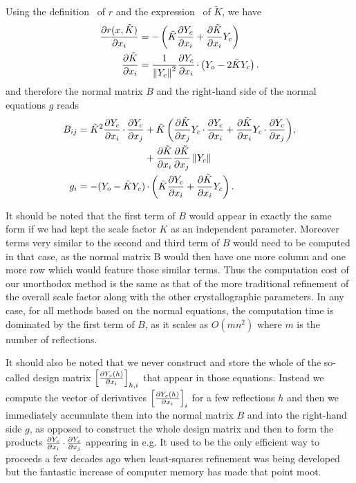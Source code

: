 \documentclass[pdf]{iucr}
\begin{document}
Using the definition~ of $r$ and the expression~ of $\tilde{K}$, we have
\begin{align}
\frac{\partial r(x, \tilde{K})}{\partial x_i} &= -\left( \tilde{K}\frac{\partial Y_c}{\partial x_i} + \frac{\partial \tilde{K}}{\partial x_i} Y_c \right) \\
\frac{\partial \tilde{K}}{\partial x_i} &= \frac{1}{\left\| Y_c \right\|^2}\frac{\partial Y_c}{\partial x_i} \operatorname{\cdot} \left(Y_o - 2 \tilde{K}Y_c \right).
\end{align}
and therefore the normal matrix $B$ and the right-hand side of the normal equations $g$ reads
\begin{align}
B_{ij} &= \begin{aligned}[t] \tilde{K}^2\frac{\partial Y_c}{\partial x_i} \operatorname{\cdot} \frac{\partial Y_c}{\partial x_j} 
&+ \tilde{K} \left( \frac{\partial \tilde{K}}{\partial x_j}Y_c \operatorname{\cdot} \frac{\partial Y_c}{\partial x_i}
+ \frac{\partial \tilde{K}}{\partial x_i}Y_c \operatorname{\cdot} \frac{\partial Y_c}{\partial x_j} \right) \nonumber\\
&+ \frac{\partial \tilde{K}}{\partial x_i}\frac{\partial \tilde{K}}{\partial x_j} \left\| Y_c \right\|
\end{aligned},
\label{eqn:normalmatrixwithoutscalefactor} \\
g_i &= - (Y_o - \tilde{K}Y_c) \operatorname{\cdot} \left( \tilde{K}\frac{\partial Y_c}{\partial x_i} + \frac{\partial \tilde{K}}{\partial x_i} Y_c \right).
\end{align}

It should be noted that the first term of $B$ would appear in exactly the same form if we had kept the scale factor $K$ as an independent parameter. Moreover terms very similar to the second and third term of $B$ would need to be computed in that case, as the normal matrix B would then have one more column and one more row which would feature those similar terms. Thus the computation cost of our unorthodox method is the same as that of the more traditional refinement of the overall scale factor along with the other crystallographic parameters. In any case, for all methods based on the normal equations, the computation time is dominated by the first term of $B$, as it scales as $O(mn^2)$ where $m$ is the number of reflections.

It should also be noted that we never construct and store the whole of the so-called design matrix $\left[ \frac{\partial Y_c(h)}{\partial x_i} \right]_{h,i}$ that appear in those equations. Instead we compute the vector of derivatives $\left[ \frac{\partial Y_c(h)}{\partial x_i} \right]_i$ for a few reflections $h$ and then we immediately accumulate them into the normal matrix $B$ and into the right-hand side $g$, as opposed to construct the whole design matrix and then to form the products $\frac{\partial Y_c}{\partial x_i} \operatorname{\cdot} \frac{\partial Y_c}{\partial x_j}$ appearing in  e.g. It used to be the only efficient way to proceeds a few decades ago when least-squares refinement was being developed but the fantastic increase of computer memory has made that point moot.
\end{document}
